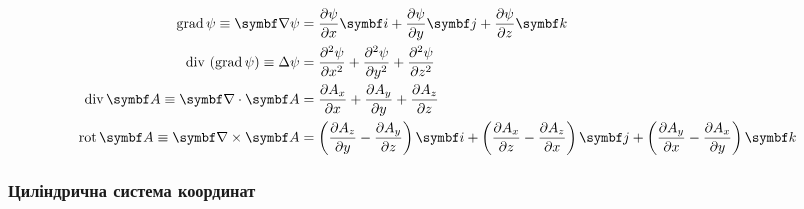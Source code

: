 \begin{align}\label{cartesian}
	\mathrm{grad}\,\psi \equiv \vect{\nabla}\psi & = \frac{\partial \psi}{\partial x} \vect{i} + \frac{\partial \psi}{\partial y} \vect{j} + \frac{\partial \psi}{\partial z} \vect{k} \\
	\mathrm{div}\,\left(\mathrm{grad}\,\psi\right) \equiv \Laplasian\psi    & = \frac{\partial^2 \psi}{\partial x^2} + \frac{\partial^2 \psi}{\partial y^2} + \frac{\partial^2 \psi }{\partial z^2}               \\
	\mathrm{div}\,\vect{A} \equiv \divg\vect{A}     & = \frac{\partial A_x}{\partial x}  + \frac{\partial A_y}{\partial y} + \frac{\partial A_z}{\partial z}                              \\
	\mathrm{rot}\,\vect{A} \equiv  \rot\vect{A}      & = \left( \frac{\partial A_z}{\partial y}  - \frac{\partial A_y}{\partial z}\right)  \vect{i} +
	\left( \frac{\partial A_x}{\partial z}  - \frac{\partial A_z}{\partial x}\right)  \vect{j} +
	\left( \frac{\partial A_y}{\partial x}  - \frac{\partial A_x}{\partial y}\right)  \vect{k}
\end{align}

\subsubsection{Циліндрична система координат}

